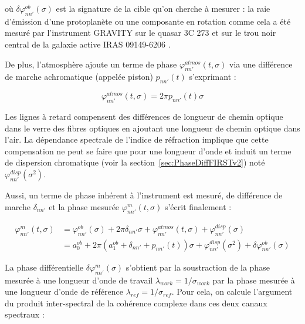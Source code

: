 \noindent où $\delta\varphi^{ob}_{nn'}(\sigma)$ est la signature de la cible qu'on cherche à mesurer : la raie d'émission d'une protoplanète ou une composante en rotation comme cela a été mesuré par l'instrument \ac{GRAVITY} sur le quasar 3C 273 \citep{sturm2018} et sur le trou noir central de la galaxie active IRAS 09149-6206 \citep{amorim2020}.

De plus, l'atmosphère ajoute un terme de phase $\varphi^{atmos}_{nn'}(t, \sigma)$ via une différence de marche achromatique (appelée piston) $p_{nn'}(t)$ s'exprimant :

\begin{equation}
    \varphi^{atmos}_{nn'}(t, \sigma) = 2\pi p_{nn'}(t) \sigma
\end{equation}

Les lignes à retard compensent des différences de longueur de chemin optique dans le verre des fibres optiques en ajoutant une longueur de chemin optique dans l'air. La dépendance spectrale de l'indice de réfraction implique que cette compensation ne peut se faire que pour une longueur d'onde et induit un terme de dispersion chromatique (voir la section~\ref{sec:PhaseDiffFIRSTv2}) noté $\varphi^{disp}_{nn'}(\sigma^2)$.

Aussi, un terme de phase inhérent à l'instrument est mesuré, de différence de marche $\delta_{nn'}$ et la phase mesurée $\varphi^{m}_{nn'}(t, \sigma)$ s'écrit finalement :

\begin{align}
    \varphi^{m}_{nn'}(t, \sigma) &= \varphi^{ob}_{nn'}(\sigma) + 2\pi\delta_{nn'}\sigma + \varphi^{atmos}_{nn'}(t, \sigma) + \varphi^{disp}_{nn'}(\sigma)\\
    &= a^{ob}_0 + 2\pi(a^{ob}_1 + \delta_{nn'} + p_{nn'}(t)) \sigma + \varphi^{disp}_{nn'}(\sigma^2) + \delta\varphi^{ob}_{nn'}(\sigma)\label{eq:phasefit}
\end{align}

La phase différentielle $\delta\varphi^{m}_{nn'}(\sigma)$ s'obtient par la soustraction de la phase mesurée à une longueur d'onde de travail $\lambda_{work} = 1 / \sigma_{work}$ par la phase mesurée à une longueur d'onde de référence $\lambda_{ref} = 1 / \sigma_{ref}$. Pour cela, on calcule l'argument du produit inter-spectral de la cohérence complexe dans ces deux canaux spectraux :

